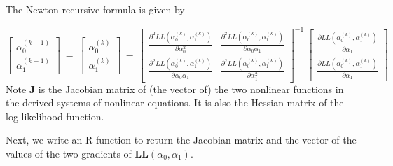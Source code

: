 \documentclass[
]{book}
\begin{document}
The Newton recursive formula is given by

\[
\left[
\begin{array}{c}
\alpha_0^{(k+1)}\\
\alpha_1^{(k+1)}
\end{array}
\right]
~=~
\left[
\begin{array}{c}
\alpha_0^{(k)}\\
\alpha_1^{(k)}
\end{array}
\right]
~-~
\left[ 
\begin{array}{cc}
\frac{\partial^2 LL(\alpha_0^{(k)},\alpha_1^{(k)})}{\partial \alpha_0^2} & \frac{\partial^2 LL(\alpha_0^{(k)},\alpha_1^{(k)})}{\partial \alpha_0\alpha_1} \\
\frac{\partial^2 LL(\alpha_0^{(k)},\alpha_1^{(k)})}{\partial \alpha_0\alpha_1} & \frac{\partial^2 LL(\alpha_0^{(k)},\alpha_1^{(k)})}{\partial \alpha_1^2}
\end{array}
\right]^{-1}
~
\left[
\begin{array}{c}
\frac{\partial LL(\alpha_0^{(k)},\alpha_1^{(k)})}{\partial \alpha_1}\\
\frac{\partial LL(\alpha_0^{(k)},\alpha_1^{(k)})}{\partial \alpha_1}
\end{array}
\right]
\]
Note \(\mathbf{J}\) is the Jacobian matrix of (the vector of) the two nonlinear functions in the derived systems of nonlinear equations. It is also the Hessian matrix of the log-likelihood function.

Next, we write an R function to return the Jacobian matrix and the vector of the values of the two gradients of \(\mathbf{LL}(\alpha_0, \alpha_1)\).
\end{document}

